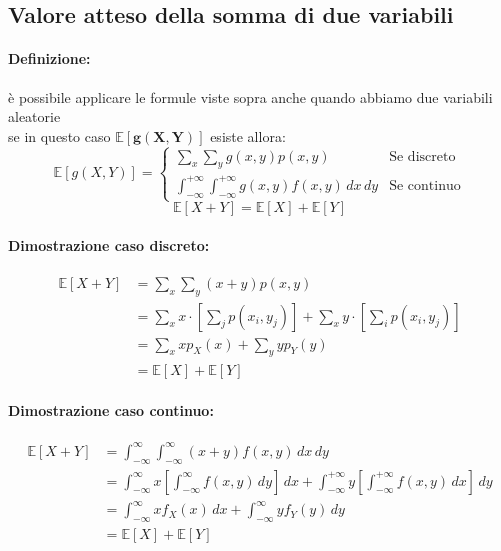 \documentclass[]{article}
\newcommand{\ev}{\mathbb{E}[X]}
\renewcommand{\ev}[1]{\mathbb{E}[#1]}
\newcommand{\definizione}{\paragraph{Definizione:}}
\begin{document}
    \subsection{Valore atteso della somma di due variabili}
    \definizione è possibile applicare le formule viste sopra anche quando abbiamo due variabili aleatorie \\
    \linebreak[4]
    se in questo caso $\boldsymbol{\ev{g(X,Y)}}$ esiste allora: \\
    \begin{equation*}
        \ev{g(X,Y)} =
        \begin{cases}
            \sum_{x}^{} \sum_{y}^{} g(x,y) p(x,y) & \text{Se discreto} \\
            \int_{-\infty}^{+\infty} \int_{-\infty}^{+\infty} g(x,y) f(x,y) \, dx \, dy & \text{Se continuo}
        \end{cases}
    \end{equation*}
    \linebreak[4]
    \[ \ev{X + Y} = \ev{X} + \ev{Y} \]

    \paragraph{Dimostrazione caso discreto:}
    \begin{equation*}
        \begin{split}
            \ev{X + Y} &= \sum_{x}^{} \sum_{y}^{} (x + y) p(x, y) \\
            & = \sum_{x}^{} x \cdot [\sum_{j}^{} p(x_i, y_j)] + \sum_{x}^{} y \cdot [\sum_{i}^{} p(x_i, y_j)] \\
            & = \sum_{x}^{} xp_X(x) + \sum_{y}^{} yp_Y(y) \\
            & = \ev{X} + \ev{Y}
        \end{split}
    \end{equation*}

    \paragraph{Dimostrazione caso continuo:}
    \begin{equation*}
        \begin{split}
            \ev{X + Y} &= \int_{-\infty}^{\infty} \int_{-\infty}^{\infty} (x + y) f(x, y) \, dx \, dy \\
            & = \int_{-\infty}^{\infty} x [\int_{-\infty}^{\infty} f(x,y) \, dy] \, dx + \int_{-\infty}^{+\infty} y [ \int_{-\infty}^{+\infty} f(x,y) \, dx ] \, dy \\
            & = \int_{-\infty}^{\infty} x f_X(x) \, dx + \int_{-\infty}^{\infty} yf_Y(y) \, dy \\
            & = \ev{X} + \ev{Y}
        \end{split}
    \end{equation*}
\end{document}

